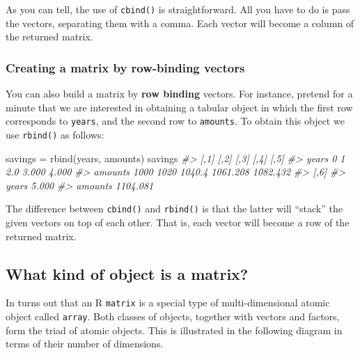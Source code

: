 \documentclass[
]{book}
\newenvironment{Shaded}{\begin{snugshade}}{\end{snugshade}}
\newcommand{\CommentTok}[1]{\textcolor[rgb]{0.56,0.35,0.01}{\textit{#1}}}
\newcommand{\FunctionTok}[1]{\textcolor[rgb]{0.00,0.00,0.00}{#1}}
\newcommand{\NormalTok}[1]{#1}
\newcommand{\OtherTok}[1]{\textcolor[rgb]{0.56,0.35,0.01}{#1}}
\begin{document}
As you can tell, the use of \texttt{cbind()} is straightforward. All you have to do
is pass the vectors, separating them with a comma. Each vector will become a
column of the returned matrix.

\hypertarget{creating-a-matrix-by-row-binding-vectors}{%
\subsubsection*{Creating a matrix by row-binding vectors}\label{creating-a-matrix-by-row-binding-vectors}}

You can also build a matrix by \textbf{row binding} vectors. For instance, pretend
for a minute that we are interested in obtaining a tabular object in which
the first row corresponds to \texttt{years}, and the second row to \texttt{amounts}. To
obtain this object we use \texttt{rbind()} as follows:

\begin{Shaded}
\begin{Highlighting}[]
\NormalTok{savings }\OtherTok{=} \FunctionTok{rbind}\NormalTok{(years, amounts)}
\NormalTok{savings}
\CommentTok{\#\textgreater{}         [,1] [,2]   [,3]     [,4]     [,5]}
\CommentTok{\#\textgreater{} years      0    1    2.0    3.000    4.000}
\CommentTok{\#\textgreater{} amounts 1000 1020 1040.4 1061.208 1082.432}
\CommentTok{\#\textgreater{}             [,6]}
\CommentTok{\#\textgreater{} years      5.000}
\CommentTok{\#\textgreater{} amounts 1104.081}
\end{Highlighting}
\end{Shaded}

The difference between \texttt{cbind()} and \texttt{rbind()} is that the latter will ``stack''
the given vectors on top of each other. That is, each vector will become a row
of the returned matrix.

\hypertarget{what-kind-of-object-is-a-matrix}{%
\subsection{What kind of object is a matrix?}\label{what-kind-of-object-is-a-matrix}}

In turns out that an R \texttt{matrix} is a special type of multi-dimensional atomic
object called \texttt{array}. Both classes of objects, together with vectors and
factors, form the triad of atomic objects. This is illustrated in the following
diagram in terms of their number of dimensions.
\end{document}
